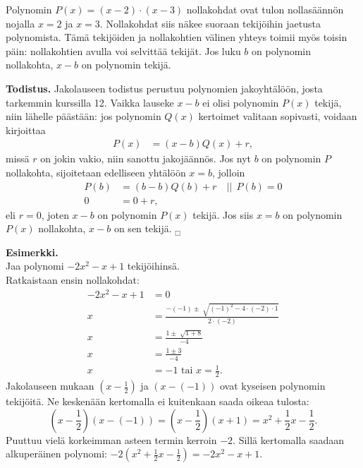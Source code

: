 Polynomin $P(x)=(x-2)\cdot(x-3)$ nollakohdat ovat tulon nollasäännön nojalla $x=2$ ja $x=3$. Nollakohdat siis näkee suoraan tekijöihin jaetusta polynomista. Tämä tekijöiden ja nollakohtien välinen yhteys toimii myös toisin päin: nollakohtien avulla voi selvittää tekijät. Jos luku $b$ on polynomin nollakohta, $x-b$ on polynomin tekijä.



\textbf{Todistus.} Jakolauseen todistus perustuu polynomien jakoyhtälöön, josta tarkemmin kurssilla 12. Vaikka lauseke $x-b$ ei olisi polynomin $P(x)$ tekijä, niin lähelle päästään: jos polynomin $Q(x)$ kertoimet valitaan sopivasti, voidaan kirjoittaa
\begin{align*}
P(x)&=(x-b)Q(x)+r,
\end{align*}
missä $r$ on jokin vakio, niin sanottu jakojäännös. Jos nyt $b$ on polynomin $P$ nollakohta, sijoitetaan edelliseen yhtälöön $x=b$, jolloin
\begin{align*}
P(b)&=(b-b)Q(b)+r \quad || \ \ P(b)=0 \\
0&=0+r,
\end{align*}
eli $r=0$, joten $x-b$ on polynomin $P(x)$ tekijä. Jos siis $x=b$ on polynomin $P(x)$ nollakohta, $x-b$ on sen tekijä. $_\Box$

\textbf{Esimerkki.} \\
Jaa polynomi $-2x^2-x+1$ tekijöihinsä.\\
Ratkaistaan ensin nollakohdat:
\begin{align*}
-2x^2-x+1&=0 \\
x&=\frac{-(-1) \pm \sqrt[]{(-1)^2-4 \cdot (-2) \cdot 1}}{2 \cdot (-2)} \\
x&=\frac{1 \pm \sqrt[]{1+8}}{-4} \\
x&=\frac{1 \pm 3}{-4} \\
x&=-1 \textrm{ tai } x = \frac{1}{2}.
\end{align*}
Jakolauseen mukaan $(x-\frac{1}{2})$ ja $(x-(-1))$ ovat kyseisen polynomin tekijöitä.
Ne keskenään kertomalla ei kuitenkaan saada oikeaa tulosta:
$$\left(x-\frac{1}{2}\right)(x-(-1))=\left(x-\frac{1}{2}\right)(x+1)=x^2+\frac{1}{2}x-\frac{1}{2}.$$
Puuttuu vielä korkeimman asteen termin kerroin $-2$. Sillä kertomalla saadaan alkuperäinen polynomi:
$-2(x^2+\frac{1}{2}x-\frac{1}{2})=-2x^2-x+1$.

